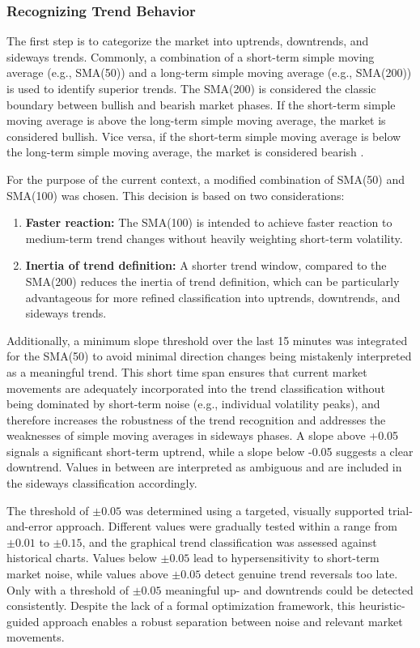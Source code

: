 \subsubsection{Recognizing Trend Behavior}
\label{chap:recognizing-trend}

The first step is to categorize the market into uptrends, downtrends, and sideways trends.
Commonly, a combination of a short-term simple moving average (e.g., SMA(50)) and a long-term simple moving average (e.g., SMA(200)) is used to identify superior trends.
The SMA(200) is considered the classic boundary between bullish and bearish market phases.
If the short-term simple moving average is above the long-term simple moving average, the market is considered bullish.
Vice versa, if the short-term simple moving average is below the long-term simple moving average, the market is considered bearish \cite{ig-regimes-mas}.

For the purpose of the current context, a modified combination of SMA(50) and SMA(100) was chosen.
This decision is based on two considerations:

\begin{enumerate}
    \item \textbf{Faster reaction:} The SMA(100) is intended to achieve faster reaction to medium-term trend changes without heavily weighting short-term volatility.
    \item \textbf{Inertia of trend definition:} A shorter trend window, compared to the SMA(200) reduces the inertia of trend definition, which can be particularly advantageous for more refined classification into uptrends, downtrends, and sideways trends.
\end{enumerate}

\noindent
Additionally, a minimum slope threshold over the last 15 minutes was integrated for the SMA(50) to avoid minimal direction changes being mistakenly interpreted as a meaningful trend.
This short time span ensures that current market movements are adequately incorporated into the trend classification without being dominated by short-term noise (e.g., individual volatility peaks), and therefore increases the robustness of the trend recognition and addresses the weaknesses of simple moving averages in sideways phases.
A slope above +0.05 signals a significant short-term uptrend, while a slope below -0.05 suggests a clear downtrend.
Values in between are interpreted as ambiguous and are included in the sideways classification accordingly.

The threshold of $\pm 0.05$ was determined using a targeted, visually supported trial-and-error approach.
Different values were gradually tested within a range from $\pm 0.01$ to $\pm 0.15$, and the graphical trend classification was assessed against historical charts.
Values below $\pm 0.05$ lead to hypersensitivity to short-term market noise, while values above $\pm 0.05$ detect genuine trend reversals too late.
Only with a threshold of $\pm 0.05$ meaningful up- and downtrends could be detected consistently.
Despite the lack of a formal optimization framework, this heuristic-guided approach enables a robust separation between noise and relevant market movements.

